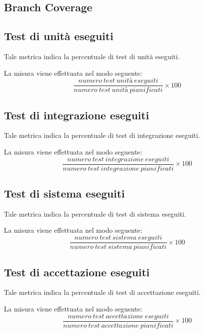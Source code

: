 \subsection{Branch Coverage}



\subsection{Test di unità eseguiti}
Tale metrica indica la percentuale di test di unità eseguiti.

La misura viene effettuata nel modo seguente:
\begin{equation}
	\frac{numero~test~unità~eseguiti}{numero~test~unità~pianificati}\times100
\end{equation}



\subsection{Test di integrazione eseguiti}
Tale metrica indica la percentuale di test di integrazione eseguiti.

La misura viene effettuata nel modo seguente:
\begin{equation}
	\frac{numero~test~integrazione~eseguiti}{numero~test~integrazione~pianificati}\times100
\end{equation}



\subsection{Test di sistema eseguiti}
Tale metrica indica la percentuale di test di sistema eseguiti.

La misura viene effettuata nel modo seguente:
\begin{equation}
	\frac{numero~test~sistema~eseguiti}{numero~test~sistema~pianificati}\times100
\end{equation}



\subsection{Test di accettazione eseguiti}
Tale metrica indica la percentuale di test di accettazione eseguiti.

La misura viene effettuata nel modo seguente:
\begin{equation}
	\frac{numero~test~accettazione~eseguiti}{numero~test~accettazione~pianificati}\times100
\end{equation}



